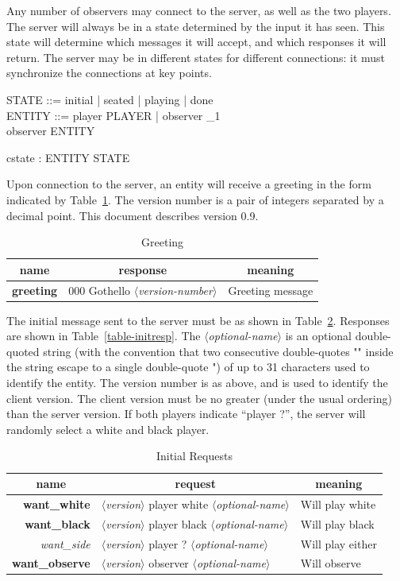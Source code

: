 \documentclass{article}
\newenvironment{reqtab}[2]{%
\begin{table}%
\centering
\caption{#2}%
\label{table-#1}%
\begin{tabular}{rll}%
\multicolumn{1}{c}{\bf name}&%
\multicolumn{1}{c}{\bf request}&%
\multicolumn{1}{c}{\bf meaning}\\\hline
}{\end{tabular}%
\end{table}}
\newenvironment{resptab}[2]{
\begin{table}%
\centering
\caption{#2}%
\label{table-#1}%
\begin{tabular}{rll}%
\multicolumn{1}{c}{\bf name}&%
\multicolumn{1}{c}{\bf response}&%
\multicolumn{1}{c}{\bf meaning}\\\hline
}{\end{tabular}%
\end{table}}
\newcommand{\stok}[1]{{$\langle${\em #1}$\rangle$}}
\newcommand{\bfid}[1]{{\bf #1}}
\newcommand{\itid}[1]{{\it #1}}
\begin{document}
Any number of observers may connect to the server, as well
as the two players.
The server will always be in a state determined by the input
it has seen.  This state will determine which messages it
will accept, and which responses it will return.  The server
may be in different states for different connections: it
must synchronize the connections at key points.
\begin{zed}
  STATE ::= initial | seated | playing | done \\
  ENTITY ::= player \ldata PLAYER \rdata | observer \ldata \nat_1 \rdata \\
  observer \in \seq ENTITY
\end{zed}
\begin{axdef}
  cstate : ENTITY \pfun STATE
\end{axdef}


Upon connection to the server, an entity will
receive a greeting in the form indicated by Table~\ref{table-greeting}.
The version number is a pair of integers separated by a
decimal point.  This document describes version 0.9.

\begin{resptab}{greeting}{Greeting}
\bfid{greeting} & 000 Gothello \stok{version-number} &Greeting message
\end{resptab}


The initial message sent to the server must be as
shown in Table~\ref{table-initreq}.
Responses are shown in Table~\ref{table-initresp}.
The \stok{optional-name} is an optional
double-quoted string (with the convention that two
consecutive double-quotes "" inside the string escape to
a single double-quote ") of up to 31 characters used to
identify the entity.  The version number is as above,
and is used to identify the client version.  The client
version must be no greater (under the usual ordering)
than the server version.
If both players indicate ``player ?'', the server will
randomly select a white and black player.

\begin{reqtab}{initreq}{Initial Requests}
\bfid{want\_white} & \stok{version} player white \stok{optional-name}
  & Will play white \\
\bfid{want\_black} & \stok{version} player black \stok{optional-name}
  & Will play black \\
\itid{want\_side} & \stok{version} player ? \stok{optional-name}
  & Will play either \\
\bfid{want\_observe} & \stok{version} observer \stok{optional-name}
  & Will observe
\end{reqtab}
\end{document}
